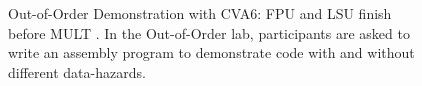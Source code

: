 
\begin{figure}[t]
    \centering



    \caption[
        Out-of-Order Demonstration with CVA6
    ]{
        Out-of-Order Demonstration with CVA6: FPU and LSU finish before MULT \cite{SiffermanLatchUp}. In the Out-of-Order lab, participants are asked to write an assembly program to demonstrate code with and without different data-hazards.
    }
    \label{fig:OoO}

\end{figure}
